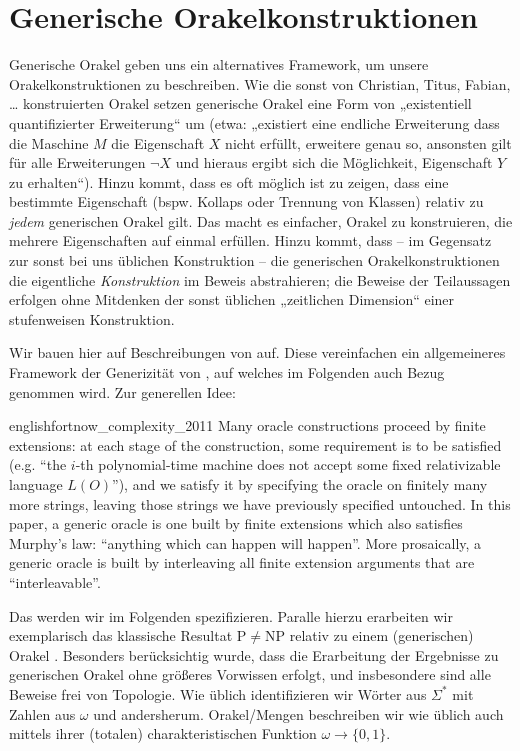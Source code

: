 \documentclass[nofonts]{uebung}
\theoremstyle{definition}
\def\P{\ensuremath{\mathrm{P}}}
\def\NP{\ensuremath{\mathrm{NP}}}
\begin{document}
\clearpage
\section{Generische Orakelkonstruktionen}

Generische Orakel geben uns ein alternatives Framework, um unsere Orakelkonstruktionen zu beschreiben. Wie die sonst von Christian, Titus, Fabian, \dots{} konstruierten Orakel setzen generische Orakel eine Form von „existentiell quantifizierter Erweiterung“ um (etwa: „existiert eine endliche Erweiterung dass die Maschine $M$ die Eigenschaft $X$ nicht erfüllt, erweitere genau so, ansonsten gilt für alle Erweiterungen $\neg X$ und hieraus ergibt sich die Möglichkeit, Eigenschaft $Y$ zu erhalten“).
Hinzu kommt, dass es oft möglich ist zu zeigen, dass eine bestimmte Eigenschaft (bspw. Kollaps oder Trennung von Klassen) relativ zu \emph{jedem} generischen Orakel gilt. Das macht es einfacher, Orakel zu konstruieren, die mehrere Eigenschaften auf einmal erfüllen.
Hinzu kommt, dass -- im Gegensatz zur sonst bei uns üblichen Konstruktion  -- die generischen Orakelkonstruktionen die eigentliche \emph{Konstruktion} im Beweis abstrahieren; die Beweise der Teilaussagen erfolgen ohne Mitdenken der sonst üblichen „zeitlichen Dimension“ einer stufenweisen Konstruktion.

Wir bauen hier auf Beschreibungen von \textcite{fortnow_complexity_2011} auf. Diese vereinfachen ein allgemeineres Framework der Generizität von \textcite{fenner_oracle_2003}, auf welches im Folgenden auch Bezug genommen wird.
Zur generellen Idee:

\begin{foreigndisplaycquote}{english}{fortnow_complexity_2011}
Many oracle constructions proceed by finite extensions: at each stage of the construction, some requirement is to be satisfied (e.g. “the $i$-th polynomial-time machine does not accept some fixed relativizable language $L(O)$”), and we satisfy it by specifying the oracle on finitely many more strings, leaving those strings we have previously specified untouched. In this paper, a generic oracle is one built by finite extensions which also satisfies Murphy’s law: “anything which can happen will happen”. More prosaically, a generic oracle is built by interleaving all finite extension arguments that are “interleavable”.
\end{foreigndisplaycquote}

Das werden wir im Folgenden spezifizieren. Paralle hierzu erarbeiten wir exemplarisch das klassische Resultat $\P\neq\NP$ relativ zu einem (generischen) Orakel \parencite{baker_relativizations_1975}.
Besonders berücksichtig wurde, dass die Erarbeitung der Ergebnisse zu generischen Orakel ohne größeres Vorwissen erfolgt, und insbesondere sind alle Beweise frei von Topologie.
Wie üblich identifizieren wir Wörter aus $\Sigma^*$ mit Zahlen aus $\omega$ und andersherum.
Orakel/Mengen beschreiben wir wie üblich auch mittels ihrer (totalen) charakteristischen Funktion $\omega\to\{0,1\}$.
\end{document}
